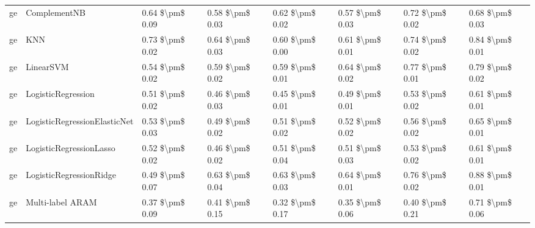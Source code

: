 \begin{tabular}{llllllll}
      ge &                    ComplementNB &     0.64 \$\textbackslash pm\$ 0.09 &           0.58 \$\textbackslash pm\$ 0.03 &       0.62 \$\textbackslash pm\$ 0.02 &        0.57 \$\textbackslash pm\$ 0.03 &                         0.72 \$\textbackslash pm\$ 0.02 &     0.68 \$\textbackslash pm\$ 0.03 \\
      ge &                             KNN &     0.73 \$\textbackslash pm\$ 0.02 &           0.64 \$\textbackslash pm\$ 0.03 &       0.60 \$\textbackslash pm\$ 0.00 &        0.61 \$\textbackslash pm\$ 0.01 &                         0.74 \$\textbackslash pm\$ 0.02 &     0.84 \$\textbackslash pm\$ 0.01 \\
      ge &                       LinearSVM &     0.54 \$\textbackslash pm\$ 0.02 &           0.59 \$\textbackslash pm\$ 0.02 &       0.59 \$\textbackslash pm\$ 0.01 &        0.64 \$\textbackslash pm\$ 0.02 &                         0.77 \$\textbackslash pm\$ 0.01 &     0.79 \$\textbackslash pm\$ 0.02 \\
      ge &              LogisticRegression &     0.51 \$\textbackslash pm\$ 0.02 &           0.46 \$\textbackslash pm\$ 0.03 &       0.45 \$\textbackslash pm\$ 0.01 &        0.49 \$\textbackslash pm\$ 0.01 &                         0.53 \$\textbackslash pm\$ 0.02 &     0.61 \$\textbackslash pm\$ 0.01 \\
      ge &    LogisticRegressionElasticNet &     0.53 \$\textbackslash pm\$ 0.03 &           0.49 \$\textbackslash pm\$ 0.02 &       0.51 \$\textbackslash pm\$ 0.02 &        0.52 \$\textbackslash pm\$ 0.02 &                         0.56 \$\textbackslash pm\$ 0.02 &     0.65 \$\textbackslash pm\$ 0.01 \\
      ge &         LogisticRegressionLasso &     0.52 \$\textbackslash pm\$ 0.02 &           0.46 \$\textbackslash pm\$ 0.02 &       0.51 \$\textbackslash pm\$ 0.04 &        0.51 \$\textbackslash pm\$ 0.03 &                         0.53 \$\textbackslash pm\$ 0.02 &     0.61 \$\textbackslash pm\$ 0.01 \\
      ge &         LogisticRegressionRidge &     0.49 \$\textbackslash pm\$ 0.07 &           0.63 \$\textbackslash pm\$ 0.04 &       0.63 \$\textbackslash pm\$ 0.03 &        0.64 \$\textbackslash pm\$ 0.01 &                         0.76 \$\textbackslash pm\$ 0.02 &     0.88 \$\textbackslash pm\$ 0.01 \\
      ge &                Multi-label ARAM &     0.37 \$\textbackslash pm\$ 0.09 &           0.41 \$\textbackslash pm\$ 0.15 &       0.32 \$\textbackslash pm\$ 0.17 &        0.35 \$\textbackslash pm\$ 0.06 &                         0.40 \$\textbackslash pm\$ 0.21 &     0.71 \$\textbackslash pm\$ 0.06 \\

\end{tabular}

